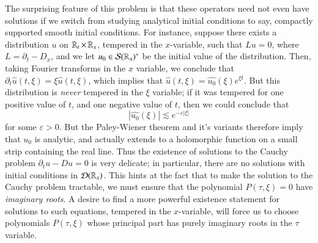 The surprising feature of this problem is that these operators need not even have solutions if we switch from studying analytical initial conditions to say, compactly supported smooth initial conditions. For instance, suppose there exists a distribution $u$ on $\operatorname{\mathbb{R}}_t \times \operatorname{\mathbb{R}}_x$, tempered in the $x$-variable, such that $Lu = 0$, where $L = \partial_t - D_x$, and we let $u_0 \in \operatorname{\mathcal{S}}(\operatorname{\mathbb{R}}_x)^*$ be the initial value of the distribution. Then, taking Fourier transforms in the $x$ variable, we conclude that $\partial_t \widehat{u}(t,\xi) = \xi \widehat{u}(t,\xi)$, which implies that $\widehat{u}(t,\xi) = \widehat{u_0}(\xi) e^{\xi t}$. But this distribution is \emph{never} tempered in the $\xi$ variable; if it was tempered for one positive value of $t$, and one negative value of $t$, then we could conclude that
%
\[ |\widehat{u_0}(\xi)| \lesssim e^{- \varepsilon |\xi|} \]
%
for some $\varepsilon > 0$. But the Paley-Wiener theorem and it's variants therefore imply that $u_0$ is analytic, and actually extends to a holomorphic function on a small strip containing the real line. Thus the existence of solutions to the Cauchy problem $\partial_t u - Du = 0$ is very delicate; in particular, there are no solutions with initial conditions in $\operatorname{\mathcal{D}}(\operatorname{\mathbb{R}}_x)$. This hints at the fact that to make the solution to the Cauchy problem tractable, we must ensure that the polynomial $P(\tau,\xi) = 0$ have \emph{imaginary roots}. A desire to find a more powerful existence statement for solutions to such equations, tempered in the $x$-variable, will force us to choose polynomials $P(\tau,\xi)$ whose principal part has purely imaginary roots in the $\tau$ variable.

%
%
%
%

